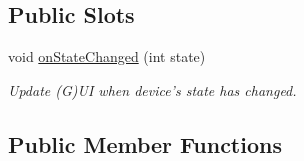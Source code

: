 \subsection*{Public Slots}
\begin{DoxyCompactItemize}
\item 
void \hyperlink{classmdt_device_u3606_a_a94a6f8b3f64cd35b33204c66816f3f6a}{on\-State\-Changed} (int state)
\begin{DoxyCompactList}\small\item\em Update (G)U\-I when device's state has changed. \end{DoxyCompactList}\end{DoxyCompactItemize}
\subsection*{Public Member Functions}
